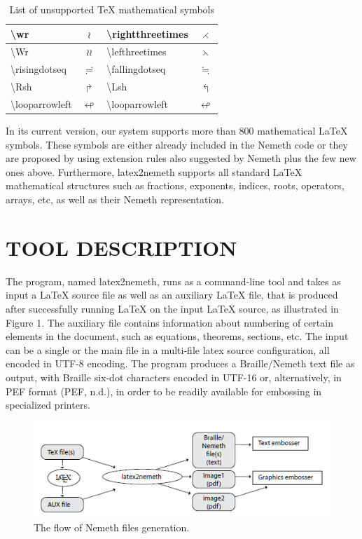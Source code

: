 \documentclass[11.5pt]{sig-alternate} %
\begin{document}
\begin{large}
\begin{table}[ht]
\caption{List of unsupported TeX mathematical symbols}
\begin{tabular}{|l|c||l|c|}
\hline
\textbackslash{}wr & $\wr$ & \textbackslash{}rightthreetimes & $\rightthreetimes$ \\ \hline
\textbackslash{}Wr & $\wr\wr$ & \textbackslash{}lefthreetimes & $\leftthreetimes$ \\ \hline
\textbackslash{}risingdotseq & $\risingdotseq$ & \textbackslash{}fallingdotseq & $\fallingdotseq$ \\ \hline
\textbackslash{}Rsh & $\Rsh$ & \textbackslash{}Lsh & $\Lsh$ \\ \hline
\textbackslash{}looparrowleft & $\looparrowleft$ & \textbackslash{}looparrowleft & $\looparrowleft$ \\ \hline
\end{tabular}
\end{table}

In its current version, our system supports more than 800 mathematical LaTeX symbols. These symbols are either already included in the Nemeth code or they are proposed by using extension rules also suggested by Nemeth plus the few new ones above. Furthermore, latex2nemeth supports all standard LaTeX mathematical structures such as fractions, exponents, indices, roots, operators, arrays, etc, as well as their Nemeth representation.

\section*{TOOL DESCRIPTION}

The program, named latex2nemeth, runs as a command-line tool and takes as input a LaTeX source file as well as an auxiliary LaTeX file, that is produced after successfully running LaTeX on the input LaTeX source, as illustrated in Figure 1. The auxiliary file contains information about numbering of certain elements in the document, such as equations, theorems, sections, etc. The input can be a single or the main file in a multi-file latex source configuration, all encoded in UTF-8 encoding. The program produces a Braille/Nemeth text file as output, with Braille six-dot characters encoded in UTF-16 or, alternatively, in PEF format (PEF, n.d.), in order to be readily available for embossing in specialized printers.

 
\begin{figure}[h]
    \centering
    \includegraphics[width=1\linewidth]{images/fig 1.png}
    \caption{The flow of Nemeth files generation.}
\end{figure}


\end{large}
\end{document}
